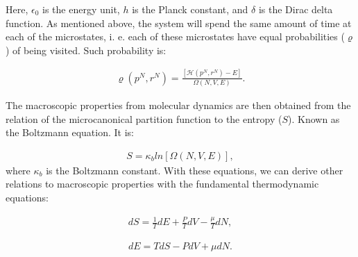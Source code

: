 Here, $\epsilon _{0}$ is the energy unit, $h$ is the Planck constant, and $\delta$ is the Dirac delta function. As mentioned above, the system will spend the same amount of time at each of the microstates, i. e. each of these microstates have equal probabilities ($\varrho$) of being visited. Such probability is:

\begin{equation}
\begin{aligned}
\varrho (p^{N},r^{N}) = \frac{[\mathcal{H}(p^{N},r^{N}) -E]}{ \Omega (N,V,E)} .
\end{aligned}
\end{equation}

The macroscopic properties from molecular dynamics are then obtained from the relation of the microcanonical partition function to the entropy ($S$). Known as the Boltzmann equation. It is:

\begin{equation}
\begin{aligned}
S = \kappa_{b} ln [\Omega (N,V,E)], 
\end{aligned}
\end{equation}
where $\kappa_{b}$ is the Boltzmann constant. With these equations, we can derive other relations to macroscopic properties with the fundamental thermodynamic equations:

\begin{equation}
\begin{aligned}
dS = \frac{1}{T} dE + \frac{P}{T} dV - \frac{\mu}{T} dN,
\end{aligned}
\end{equation}

\begin{equation}
\label{eq:fteq}
\begin{aligned}
dE =  T dS - P dV + \mu dN .
\end{aligned}
\end{equation}

